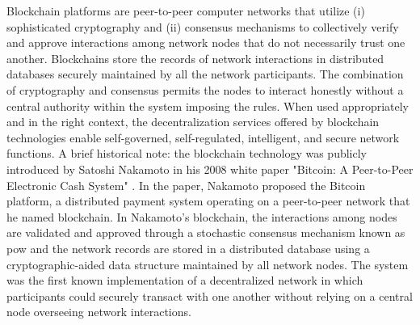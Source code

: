 \documentclass[conference]{IEEEtran}
\begin{document}
%
Blockchain platforms are peer-to-peer computer networks that utilize (i) sophisticated cryptography and (ii) consensus mechanisms to collectively verify and approve interactions among network nodes that do not necessarily trust one another. Blockchains store the records of network interactions in distributed databases securely maintained by all the network participants. The combination of cryptography and consensus permits the nodes to interact honestly without a central authority within the system imposing the rules. When used appropriately and in the right context, the decentralization services offered by blockchain technologies enable self-governed, self-regulated, intelligent, and secure network functions. A brief historical note: the blockchain technology was publicly introduced by Satoshi Nakamoto in his 2008 white paper "Bitcoin: A Peer-to-Peer Electronic Cash System" \cite{01}. In the paper, Nakamoto proposed the Bitcoin platform, a distributed payment system operating on a peer-to-peer network that he named blockchain. In Nakamoto's blockchain, the interactions among nodes are validated and approved through a stochastic consensus mechanism known as \ac{pow} and the network records are stored in a distributed database using a cryptographic-aided data structure maintained by all network nodes. The system was the first known implementation of a decentralized network in which participants could securely transact with one another without relying on a central node overseeing network interactions. \\
\end{document}
